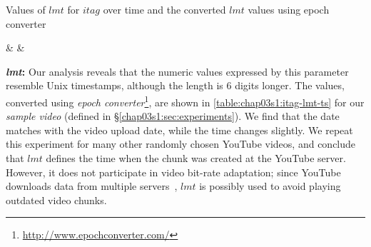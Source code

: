 \begin{table}[!t]
 \small
\caption{\small{Values of $lmt$ for $itag$ over time and the converted $lmt$ values using epoch converter}}
\label{table:chap03s1:itag-lmt-ts}
 \centering
{\csvcoli & \csvcolii & \csvcoliii}%
\end{table}


{\bf {\em lmt}:} Our analysis reveals that the numeric values expressed by this parameter resemble Unix timestamps, although the length is $6$ digits longer.
The values, converted using {\em epoch converter}\footnote{\url{http://www.epochconverter.com/}}, are shown in \tbl\ref{table:chap03s1:itag-lmt-ts} for our {\it sample video} (defined in \S\ref{chap03s1:sec:experiments}).
We find that the date matches with the video upload date, while the time changes slightly.
We repeat this experiment for many other randomly chosen YouTube videos, and conclude that $lmt$ defines the time when the chunk was created at the YouTube server.
However, it does not participate in video bit-rate adaptation; since YouTube downloads data from multiple servers~\cite{krishnappa2013dashing}, $lmt$ is possibly used to avoid playing outdated video chunks.

